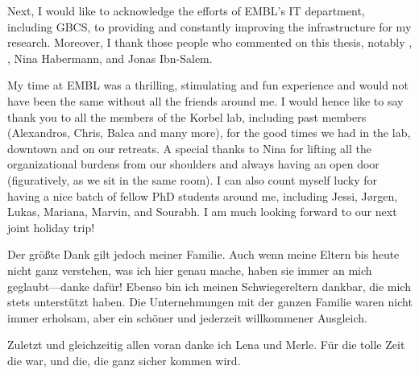 Next, I would like to acknowledge the efforts of EMBL's IT department, including
GBCS, to providing and constantly improving the infrastructure for my research.
Moreover, I thank those people who commented on this thesis, notably \jan,
\ashley, Nina Habermann, \alek and Jonas Ibn-Salem.

My time at EMBL was a thrilling, stimulating and fun experience and would not
have been the same without all the friends around me. I would hence like to say
thank you to all the members of the Korbel lab, including past members (Alexandros,
Chris, Balca and many more), for the good times we had in the lab, downtown and
on our retreats. A special thanks to Nina for lifting all the organizational
burdens from our shoulders and always having an open door (figuratively, as we
sit in the same room). I can also count myself lucky for having a nice batch of
fellow PhD students around me, including Jessi, Jørgen, Lukas, Mariana, Marvin,
and Sourabh. I am much looking forward to our next joint holiday trip!

Der größte Dank gilt jedoch meiner Familie. Auch wenn
meine Eltern bis heute nicht ganz verstehen, was ich hier genau mache, haben
sie immer an mich ge\-glaubt---danke dafür! Ebenso bin ich meinen Schwiegereltern
dankbar, die mich stets unterstützt haben. Die Unternehmungen mit der ganzen
Familie waren nicht immer erholsam, aber ein schöner und jederzeit willkommener
Ausgleich.

Zuletzt und gleichzeitig allen voran danke ich Lena und Merle. Für die
tolle Zeit die war, und die, die ganz sicher kommen wird.
